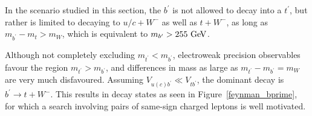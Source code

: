 
In the scenario studied in this section, the $b^\prime$ is not allowed to decay into a $t^\prime$, but rather is limited to decaying to $u/c+W^{-}$ as well as $t+W^{-}$, as long as $m_{b^\prime}-m_{t}> m_W$, which is equivalent to $m_{b^\prime} > 255 \GeV{}$.

Although not completely excluding $m_{t^\prime}<m_{b^\prime}$, electroweak precision observables favour the region $m_{t^\prime}>m_{b^\prime}$, and differences in mass as large as $m_{t^\prime}-m_{b^\prime}=m_{W}$ are very much disfavoured. 
Assuming $V_{u(c) b^\prime}\ll V_{t b^\prime}$, the dominant decay is $b^\prime \rightarrow t+ W^{-}$.
This results in decay states as seen in Figure~\ref{feynman_bprime}, for which a search involving pairs of same-sign charged leptons is well motivated.

